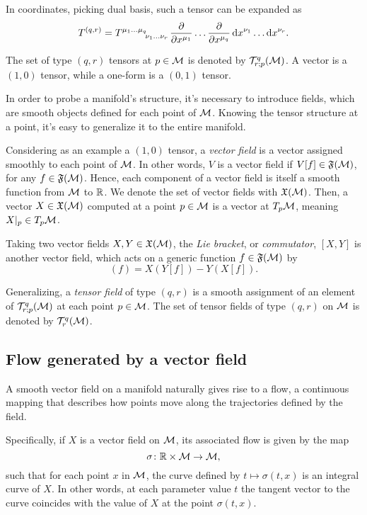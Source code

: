 In coordinates, picking dual basis, such a tensor can be expanded as
\begin{equation}
	T^{(q,r)} = \tensor{T}{^{\mu_1}^\dots^{\mu_q}_{\nu_1}_\dots_{\nu_r}} \frac{\de}{\de x^{\mu_1}} \dots \frac{\de}{\de x^{\mu_q}} \ud x^{\nu_1} \dots \ud x^{\nu_r}.
\end{equation}

The set of type $(q,r)$ tensors at $p \in \mathcal{M}$ is denoted by $\mathcal{T}^q_{r;p}(\mathcal{M})$. A vector is a $(1,0)$ tensor, while a one-form is a $(0,1)$ tensor.

In order to probe a manifold's structure, it's necessary to introduce fields, which are smooth objects defined for each point of $\mathcal{M}$. Knowing the tensor structure at a point, it's easy to generalize it to the entire manifold.

Considering as an example a $(1,0)$ tensor, a \emph{vector field} is a vector assigned smoothly to each point of $\mathcal{M}$. In other words, $V$ is a vector field if $V[f] \in \mathfrak{F}(\mathcal{M})$, for any $f \in \mathfrak{F}(\mathcal{M})$. Hence, each component of a vector field is itself a smooth function from $\mathcal{M}$ to $\mathbb{R}$. We denote the set of vector fields with $\mathfrak{X}(\mathcal{M})$. Then, a vector $X \in \mathfrak{X}(\mathcal{M})$ computed at a point $p \in \mathcal{M}$ is a vector at $T_p \mathcal{M}$, meaning $X|_p \in T_p \mathcal{M}$.

Taking two vector fields $X,Y \in \mathfrak{X}(\mathcal{M})$, the \emph{Lie bracket}, or \emph{commutator}, $[X,Y]$ is another vector field, which acts on a generic function $f \in \mathfrak{F}(\mathcal{M})$ by
\begin{equation}
	[X,Y](f) = X (Y[f]) - Y(X[f]).
\end{equation}

Generalizing, a \emph{tensor field} of type $(q,r)$ is a smooth assignment of an element of $\mathcal{T}^q_{r;p}(\mathcal{M})$ at each point $p \in \mathcal{M}$. The set of tensor fields of type $(q,r)$ on $\mathcal{M}$ is denoted by $\mathcal{T}^q_r(\mathcal{M})$.

\subsection{Flow generated by a vector field}
A smooth vector field on a manifold naturally gives rise to a flow, a continuous mapping that describes how points move along the trajectories defined by the field.

Specifically, if $X$ is a vector field on $\mathcal{M}$, its associated flow is given by the map
\begin{equation}
    \sigma \colon \mathbb{R} \times \mathcal{M} \to \mathcal{M},
\end{equation}
such that for each point $x$ in $\mathcal{M}$, the curve defined by $t \mapsto \sigma(t, x)$ is an integral curve of $X$. In other words, at each parameter value $t$ the tangent vector to the curve coincides with the value of $X$ at the point $\sigma(t,x)$.

